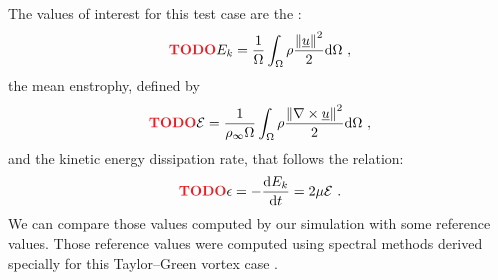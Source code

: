       \paragraph{}
      The values of interest for this test case are the :
      \begin{equation} \PS{TODO}
        E_k = \frac{1}{\Omega} \int_\Omega \rho \frac{\norm{\vec{u}}^2}{2} \mathrm{d}\Omega \ ,
      \end{equation}
      the mean enstrophy, defined by
      \begin{equation} \PS{TODO}
        \mathcal{E} = \frac{1}{\rho_\infty \Omega} \int_\Omega \rho \frac{\norm{\nabla \times \vec{u}}^2}{2} \mathrm{d}\Omega \ ,
      \end{equation}
      and the kinetic energy dissipation rate, that follows the relation:
      \begin{equation} \PS{TODO}
        \epsilon = -\frac{\mathrm{d} E_k}{\mathrm{d} t} = 2 \mu \mathcal{E} \ .
      \end{equation}
      We can compare those values computed by our simulation with some reference values.
      Those reference values were computed using spectral methods derived specially for this Taylor--Green vortex case .

